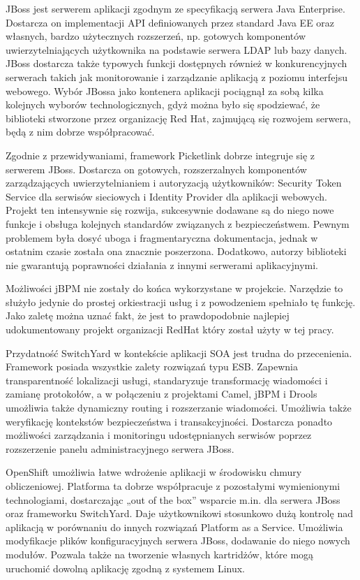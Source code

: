 JBoss jest serwerem aplikacji zgodnym ze specyfikacją serwera Java Enterprise. Dostarcza on implementacji API definiowanych przez standard Java EE oraz własnych, bardzo użytecznych rozszerzeń, np. gotowych komponentów uwierzytelniających użytkownika na podstawie serwera LDAP lub bazy danych. JBoss dostarcza także typowych funkcji dostępnych również w konkurencyjnych serwerach takich jak monitorowanie i zarządzanie aplikacją z poziomu interfejsu webowego. Wybór JBossa jako kontenera aplikacji pociągnął za sobą kilka kolejnych wyborów technologicznych, gdyż można było się spodziewać, że biblioteki stworzone przez organizację Red Hat, zajmującą się rozwojem serwera, będą z nim dobrze współpracować.

Zgodnie z przewidywaniami, framework Picketlink dobrze integruje się z serwerem JBoss. Dostarcza on gotowych, rozszerzalnych komponentów zarządzających uwierzytelnianiem i autoryzacją użytkowników: Security Token Service dla serwisów sieciowych i Identity Provider dla aplikacji webowych. Projekt ten intensywnie się rozwija, sukcesywnie dodawane są do niego nowe funkcje i obsługa kolejnych standardów związanych z bezpieczeństwem. Pewnym problemem była dosyć uboga i fragmentaryczna dokumentacja, jednak w ostatnim czasie została ona znacznie poszerzona. Dodatkowo, autorzy biblioteki nie gwarantują poprawności działania z innymi serwerami aplikacyjnymi.

Możliwości jBPM nie zostały do końca wykorzystane w projekcie. Narzędzie to służyło jedynie do prostej orkiestracji usług i z powodzeniem spełniało tę funkcję. Jako zaletę można uznać fakt, że jest to prawdopodobnie najlepiej udokumentowany projekt organizacji RedHat który został użyty w tej pracy.

Przydatność SwitchYard w kontekście aplikacji SOA jest trudna do przecenienia. Framework posiada wszystkie zalety rozwiązań typu ESB. Zapewnia transparentność lokalizacji usługi, standaryzuje transformację wiadomości i zamianę protokołów, a w połączeniu z projektami Camel, jBPM i Drools umożliwia także dynamiczny routing i rozszerzanie wiadomości. Umożliwia także weryfikację kontekstów bezpieczeństwa i transakcyjności. Dostarcza ponadto możliwości zarządzania i monitoringu udostępnianych serwisów poprzez rozszerzenie panelu administracyjnego serwera JBoss.

OpenShift umożliwia łatwe wdrożenie aplikacji w środowisku chmury obliczeniowej. Platforma ta dobrze współpracuje z pozostałymi wymienionymi technologiami, dostarczając „out of the box” wsparcie m.in. dla serwera JBoss oraz frameworku SwitchYard. Daje użytkownikowi stosunkowo dużą kontrolę nad aplikacją w porównaniu do innych rozwiązań Platform as a Service. Umożliwia modyfikacje plików konfiguracyjnych serwera JBoss, dodawanie do niego nowych modułów. Pozwala także na tworzenie własnych kartridżów, które mogą uruchomić dowolną aplikację zgodną z systemem Linux. 


